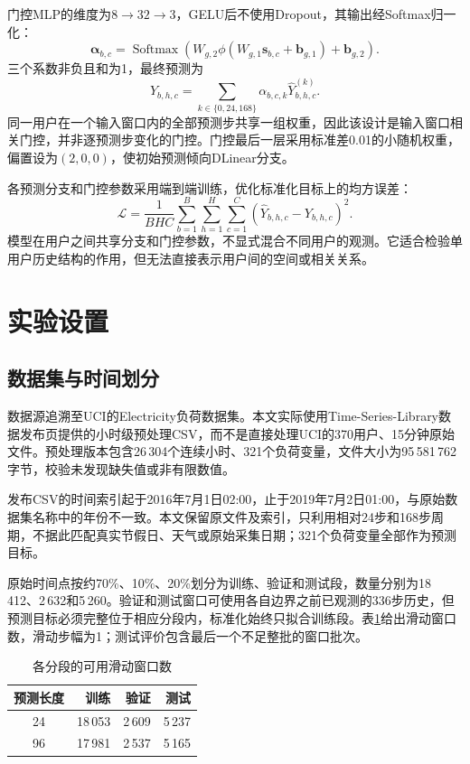 \documentclass[UTF8,a4paper,zihao=5,fontset=windows]{ctexart}
\begin{document}
门控MLP的维度为$8\rightarrow32\rightarrow3$，GELU后不使用Dropout，其输出经Softmax归一化：
\begin{equation}
\boldsymbol\alpha_{b,c}=\operatorname{Softmax}
\left(W_{g,2}\phi(W_{g,1}\boldsymbol s_{b,c}+\boldsymbol b_{g,1})
+\boldsymbol b_{g,2}\right).
\end{equation}
三个系数非负且和为1，最终预测为
\begin{equation}
\widehat Y_{b,h,c}=\sum_{k\in\{0,24,168\}}
\alpha_{b,c,k}\widehat Y^{(k)}_{b,h,c}.
\label{eq:fusion}
\end{equation}
同一用户在一个输入窗口内的全部预测步共享一组权重，因此该设计是输入窗口相关门控，并非逐预测步变化的门控。门控最后一层采用标准差0.01的小随机权重，偏置设为$(2,0,0)$，使初始预测倾向DLinear分支。

各预测分支和门控参数采用端到端训练，优化标准化目标上的均方误差：
\begin{equation}
\mathcal L=\frac{1}{BHC}\sum_{b=1}^{B}\sum_{h=1}^{H}\sum_{c=1}^{C}
(\widehat Y_{b,h,c}-Y_{b,h,c})^2.
\end{equation}
模型在用户之间共享分支和门控参数，不显式混合不同用户的观测。它适合检验单用户历史结构的作用，但无法直接表示用户间的空间或相关关系。

\section{实验设置}
\subsection{数据集与时间划分}
数据源追溯至UCI的Electricity负荷数据集\cite{trindade2015electricity}。本文实际使用Time-Series-Library数据发布页提供的小时级预处理CSV\cite{tsldata}，而不是直接处理UCI的370用户、15分钟原始文件。预处理版本包含26\,304个连续小时、321个负荷变量，文件大小为95\,581\,762字节，校验未发现缺失值或非有限数值。

发布CSV的时间索引起于2016年7月1日02:00，止于2019年7月2日01:00，与原始数据集名称中的年份不一致。本文保留原文件及索引，只利用相对24步和168步周期，不据此匹配真实节假日、天气或原始采集日期；321个负荷变量全部作为预测目标。

原始时间点按约70\%、10\%、20\%划分为训练、验证和测试段，数量分别为18\,412、2\,632和5\,260。验证和测试窗口可使用各自边界之前已观测的336步历史，但预测目标必须完整位于相应分段内，标准化始终只拟合训练段。表\ref{tab:windows}给出滑动窗口数，滑动步幅为1；测试评价包含最后一个不足整批的窗口批次。

\begin{table}[t]
\centering
\caption{各分段的可用滑动窗口数}
\label{tab:windows}
\vspace{4pt}
\small\setlength{\tabcolsep}{9pt}
\begin{tabular}{crrr}\toprule
预测长度 & 训练 & 验证 & 测试\\\midrule
24 & 18\,053 & 2\,609 & 5\,237\\
96 & 17\,981 & 2\,537 & 5\,165\\\bottomrule
\end{tabular}
\end{table}
\end{document}
